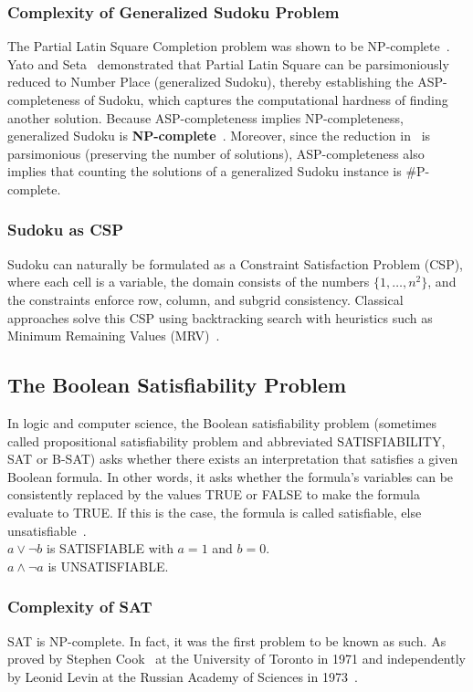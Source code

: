 \documentclass[12pt]{article}
\begin{document}
\subsubsection{Complexity of Generalized Sudoku Problem}
The Partial Latin Square Completion problem was shown to be NP-complete~\citep{Colbourn1984}. Yato and Seta~\citep{Yato2003} demonstrated that Partial Latin Square can be parsimoniously reduced to Number Place (generalized Sudoku), thereby establishing the ASP-completeness of Sudoku, which captures the computational hardness of finding another solution. Because ASP-completeness implies NP-completeness, generalized Sudoku is \textbf{NP-complete}~\citep{Yato2003}. Moreover, since the reduction in~\citep{Yato2003} is parsimonious (preserving the number of solutions), ASP-completeness also implies that counting the solutions of a generalized Sudoku instance is \#P-complete.


\subsubsection{Sudoku as CSP}
Sudoku can naturally be formulated as a Constraint Satisfaction
Problem (CSP), where each cell is a variable, the domain consists
of the numbers $\{1,\dots,n^2\}$, and the constraints enforce
row, column, and subgrid consistency.
Classical approaches solve this CSP using backtracking search
with heuristics such as Minimum Remaining Values (MRV)~\citep{RussellNorvig2010, Dechter2003}.


\subsection{The Boolean Satisfiability Problem}
In logic and computer science, the Boolean satisfiability problem (sometimes called propositional satisfiability problem and abbreviated SATISFIABILITY, SAT or B-SAT) asks whether there exists an interpretation that satisfies a given Boolean formula. In other words, it asks whether the formula's variables can be consistently replaced by the values TRUE or FALSE to make the formula evaluate to TRUE. If this is the case, the formula is called satisfiable, else unsatisfiable~\citep{wikiSAT}.\\
$ a \vee \neg b $ is SATISFIABLE with $a = 1 $ and $b = 0$.\\ 
$a \wedge \neg a $ is UNSATISFIABLE.


\subsubsection{Complexity of SAT}
SAT is NP-complete. In fact, it was the first problem to be known as such. As proved by Stephen Cook~\citep{Cook1971} at the University of Toronto in 1971 and independently by Leonid Levin at the Russian Academy of Sciences in 1973~\citep{wikiSAT}.
\end{document}
